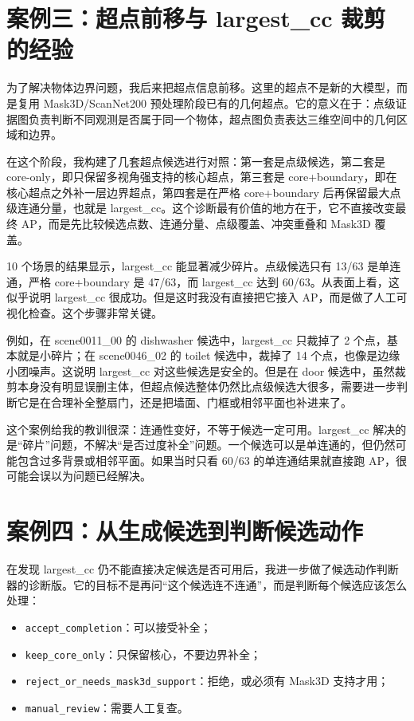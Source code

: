 \documentclass[UTF8,a4paper,12pt]{ctexart}
\begin{document}
\section{案例三：超点前移与 largest\_cc 裁剪的经验}

为了解决物体边界问题，我后来把超点信息前移。这里的超点不是新的大模型，而是复用 Mask3D/ScanNet200 预处理阶段已有的几何超点。它的意义在于：点级证据图负责判断不同观测是否属于同一个物体，超点图负责表达三维空间中的几何区域和边界。

在这个阶段，我构建了几套超点候选进行对照：第一套是点级候选，第二套是 core-only，即只保留多视角强支持的核心超点，第三套是 core+boundary，即在核心超点之外补一层边界超点，第四套是在严格 core+boundary 后再保留最大点级连通分量，也就是 largest\_cc。这个诊断最有价值的地方在于，它不直接改变最终 AP，而是先比较候选点数、连通分量、点级覆盖、冲突重叠和 Mask3D 覆盖。

10 个场景的结果显示，largest\_cc 能显著减少碎片。点级候选只有 13/63 是单连通，严格 core+boundary 是 47/63，而 largest\_cc 达到 60/63。从表面上看，这似乎说明 largest\_cc 很成功。但是这时我没有直接把它接入 AP，而是做了人工可视化检查。这个步骤非常关键。

例如，在 scene0011\_00 的 dishwasher 候选中，largest\_cc 只裁掉了 2 个点，基本就是小碎片；在 scene0046\_02 的 toilet 候选中，裁掉了 14 个点，也像是边缘小团噪声。这说明 largest\_cc 对这些候选是安全的。但是在 door 候选中，虽然裁剪本身没有明显误删主体，但超点候选整体仍然比点级候选大很多，需要进一步判断它是在合理补全整扇门，还是把墙面、门框或相邻平面也补进来了。

这个案例给我的教训很深：连通性变好，不等于候选一定可用。largest\_cc 解决的是“碎片”问题，不解决“是否过度补全”问题。一个候选可以是单连通的，但仍然可能包含过多背景或相邻平面。如果当时只看 60/63 的单连通结果就直接跑 AP，很可能会误以为问题已经解决。

\section{案例四：从生成候选到判断候选动作}

在发现 largest\_cc 仍不能直接决定候选是否可用后，我进一步做了候选动作判断器的诊断版。它的目标不是再问“这个候选连不连通”，而是判断每个候选应该怎么处理：

\begin{itemize}
    \item \texttt{accept\_completion}：可以接受补全；
    \item \texttt{keep\_core\_only}：只保留核心，不要边界补全；
    \item \texttt{reject\_or\_needs\_mask3d\_support}：拒绝，或必须有 Mask3D 支持才用；
    \item \texttt{manual\_review}：需要人工复查。
\end{itemize}
\end{document}
